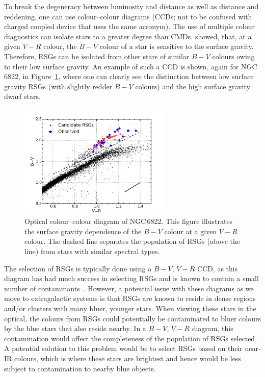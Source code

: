 To break the degeneracy between luminosity and distance as well as distance and reddening, one can use colour--colour diagrams (CCDs; not to be confused with charged coupled device that uses the same acronym).
The use of multiple colour diagnostics can isolate stars to a greater degree than CMDs.
\cite{1998ApJ...501..153M} showed, that, at a given $V-R$ colour, the $B-V$ colour of a star is sensitive to the surface gravity.
Therefore, RSGs can be isolated from other stars of similar $B-V$ colours owing to their low surface gravity.
An example of such a CCD  is shown, again for NGC\,6822, in Figure~\ref{fig:CCD}, where one can clearly see the distinction between low surface gravity RSGs
(with slightly redder $B-V$ colours) and the high surface gravity dwarf stars.

\begin{figure}
 \centering
 \includegraphics[width=0.65\textwidth]{intro/N6822_bvr}
 \caption[Optical $B-V$, $V-R$ colour--colour diagram]{Optical colour--colour diagram of NGC\,6822. This figure illustrates the surface gravity dependence of the $B-V$ colour at a given $V-R$ colour.
 The dashed line separates the population of RSGs (above the line) from stars with similar spectral types.
 \label{fig:CCD}}
\end{figure}

The selection of RSGs is typically done using a $B-V$, $V-R$ CCD, as this diagram has had much success in selecting RSGs and is known to contain a small number of contaminants~\citep[e.g.][]{1998ApJ...501..153M,MasseyOlsen03,Levesque05,Levesque06,2012AJ....144....2L,2015ApJ...803...14P}.
However, a potential issue with these diagrams as we move to extragalactic systems is that RSGs are known to reside in dense regions and/or clusters with many bluer, younger stars.
When viewing these stars in the optical, the colours from RSGs could potentially be contaminated to bluer colours by the blue stars that also reside nearby.
In a $B-V$, $V-R$ diagram, this contamination would affect the completeness of the population of RSGs selected.
A potential solution to this problem would be to select RSGs based on their near-IR colours, which is where these stars are brightest and hence would be less subject to contamination to nearby blue objects.

